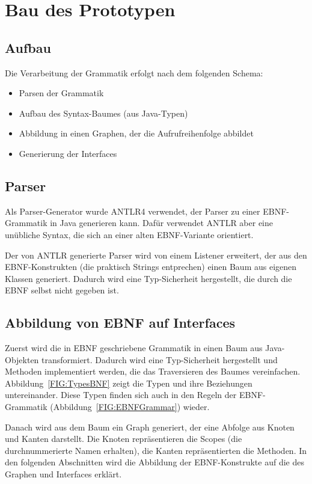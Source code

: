 \documentclass[../InterneDSLs.tex]{subfiles}
\begin{document}
\chapter{Bau des Prototypen}

\section{Aufbau}
Die Verarbeitung der Grammatik erfolgt nach dem folgenden Schema:
\begin{itemize}
	\item Parsen der Grammatik
	\item Aufbau des Syntax-Baumes (aus Java-Typen)
	\item Abbildung in einen Graphen, der die Aufrufreihenfolge abbildet
	\item Generierung der Interfaces
\end{itemize}

\section{Parser}
Als Parser-Generator wurde ANTLR4 verwendet, der Parser zu einer EBNF-Grammatik in Java generieren kann. Dafür verwendet ANTLR aber eine unübliche Syntax, die sich an einer alten EBNF-Variante orientiert.

Der von ANTLR generierte Parser wird von einem Listener erweitert, der aus den EBNF-Konstrukten (die praktisch Strings entprechen) einen Baum aus eigenen Klassen generiert. Dadurch wird eine Typ-Sicherheit hergestellt, die durch die EBNF selbst nicht gegeben ist.

\section{Abbildung von EBNF auf Interfaces}
Zuerst wird die in EBNF geschriebene Grammatik in einen Baum aus Java-Objekten transformiert. Dadurch wird eine Typ-Sicherheit hergestellt und Methoden implementiert werden, die das Traversieren des Baumes vereinfachen. Abbildung~\ref{FIG:TypesBNF} zeigt die Typen und ihre Beziehungen untereinander. Diese Typen finden sich auch in den Regeln der EBNF-Grammatik (Abbildung~\ref{FIG:EBNFGrammar}) wieder.

Danach wird aus dem Baum ein Graph generiert, der eine Abfolge aus Knoten und Kanten darstellt. Die Knoten repräsentieren die Scopes (die durchnummerierte Namen erhalten), die Kanten repräsentierten die Methoden. In den folgenden Abschnitten wird die Abbildung der EBNF-Konstrukte auf die des Graphen und Interfaces erklärt.
\end{document}
